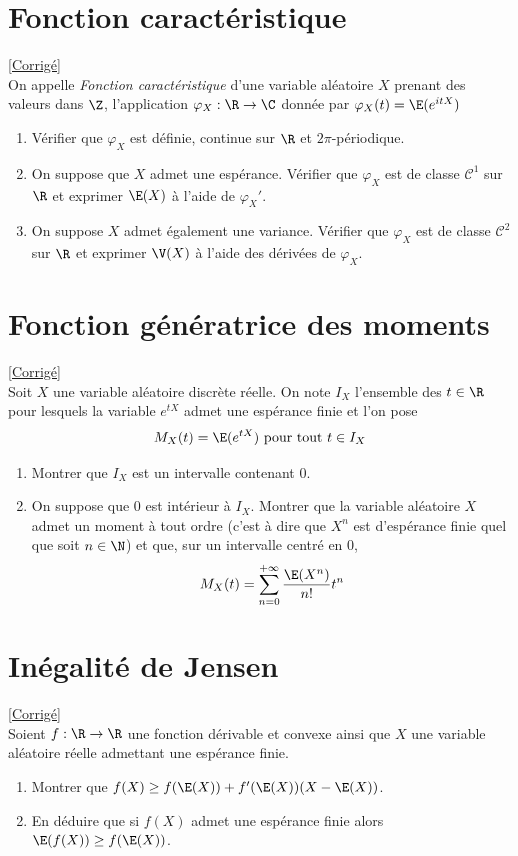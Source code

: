 \documentclass[8pt]{book}
\begin{document}
\section{Fonction caractéristique }
\label{Fonction caractéristique}
\textcolor{blue}{\hyperref[Fonction caractéristique corrigé]{[Corrigé]}}\\
On appelle \textit{Fonction caractéristique} d'une variable aléatoire $X$ prenant des valeurs dans $\Z$, l'application $\varphi_X:\R\to\C$ donnée par $\varphi_X(t)=\E(e^{itX})$
\begin{enumerate}
	\item Vérifier que $\varphi_X$ est définie, continue sur $\R$ et $2\pi$-périodique.
	\item On suppose que $X$ admet une espérance. Vérifier que $\varphi_X$ est de classe $\mathcal{C}^1$ sur $\R$ et exprimer $\E(X)$ à l'aide de $\varphi_X'$.
	\item On suppose $X$ admet également une variance. Vérifier que $\varphi_X$ est de classe $\mathcal{C}^2$ sur $\R$ et exprimer $\V(X)$ à l'aide des dérivées de $\varphi_X$.
\end{enumerate}

\section{Fonction génératrice des moments }
\label{Fonction génératrice des moments}
\textcolor{blue}{\hyperref[Fonction génératrice des moments corrigé]{[Corrigé]}}\\
Soit $X$ une variable aléatoire discrète réelle. On note $I_X$ l'ensemble des $t\in\R$ pour lesquels la variable $e^{tX}$ admet une espérance finie et l'on pose $$M_X(t)=\E(e^{tX}) \ \text{pour tout } t\in I_X$$
\begin{enumerate}
	\item Montrer que $I_X$ est un intervalle contenant $0$.
	\item On suppose que $0$ est intérieur à $I_X$. Montrer que la variable aléatoire $X$ admet un moment à tout ordre (c'est à dire que $X^n$ est d'espérance finie quel que soit $n\in \N$) et que, sur un intervalle centré en $0$, $$M_X(t)=\displaystyle\sum\limits_{n=0}^{+\infty}\frac{\E(X^n)}{n!}t^n$$
\end{enumerate}

\section{Inégalité de Jensen }
\label{Inégalité de Jensen}
\textcolor{blue}{\hyperref[Inégalité de Jensen corrigé]{[Corrigé]}}\\
Soient $f:\R\to\R$ une fonction dérivable et convexe ainsi que $X$ une variable aléatoire réelle admettant une espérance finie.
\begin{enumerate}
	\item Montrer que $f(X)\geq f(\E(X))+f'(\E(X))(X-\E(X))$.
	\item En déduire que si $f(X)$ admet une espérance finie alors $\E(f(X))\geq f(\E(X))$.
\end{enumerate}
\end{document}
